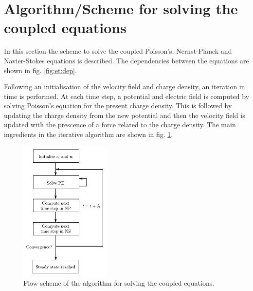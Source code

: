 \section{Algorithm/Scheme for solving the coupled equations}
In this section the scheme to solve the coupled Poisson's, Nernst-Planck and
Navier-Stokes equations is described. The dependencies between the
equations are shown in fig. \ref{fig:et:dep}. 

Following an initialisation of
the velocity field and charge density, an iteration in time is
performed. At each time step, a potential and electric field is
computed by solving Poisson's equation for the present charge
density. This is followed by updating the charge density from the new
potential and then the velocity field is updated with the prescence of
a force related to the charge density. The main ingredients in the
iterative algorithm are shown in fig. \ref{fig:lbm:full_algo}. 

\begin{figure}
\begin{center}
\includegraphics[width=0.4\textwidth]{fig/full_algorithm.pdf}
\end{center}
\caption{Flow scheme of the algorithm for solving the coupled equations.}
\label{fig:lbm:full_algo}
\end{figure}
